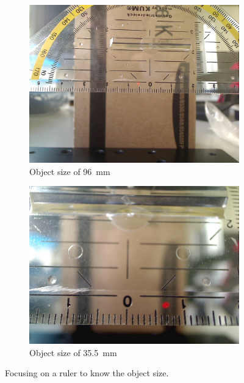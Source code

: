 \documentclass[a4paper, 12pt]{paper}
\begin{document}
\begin{figure}[h]
    \centering
    \begin{subfigure}[b]{0.45\textwidth}
        \includegraphics[width=\textwidth]{img/focale1.jpg}
        \caption{Object size of \SI{96}{\milli\meter}}
    \end{subfigure}
    \begin{subfigure}[b]{0.45\textwidth}
        \includegraphics[width=\textwidth]{img/focale2.jpg}
        \caption{Object size of \SI{35.5}{\milli\meter}}
    \end{subfigure}
    \caption{Focusing on a ruler to know the object size.}
\label{fig:focus_length}
\end{figure}
\end{document}
